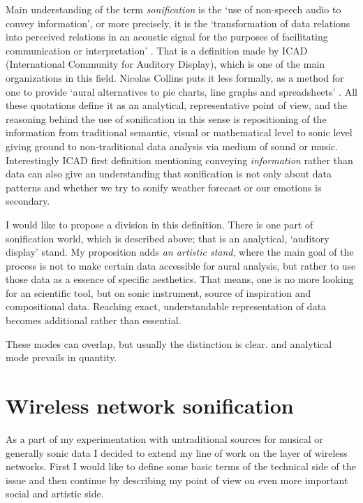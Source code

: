 \documentclass[11pt,a4paper,oneside]{report}
\begin{document}
Main understanding of the term \textit{sonification} is the `use of non-speech audio to convey information', or more precisely, it is the `transformation of data relations into perceived relations in an acoustic signal for the purposes of facilitating communication or interpretation' \cite{Fitch}. That is a definition made by ICAD (International Community for Auditory Display), which is one of the main organizations in this field. Nicolas Collins puts it less formally, as a method for one to provide `aural alternatives to pie charts, line graphs and spreadsheets' \cite{Collins2006}. All these quotations define it as an analytical, representative point of view, and the reasoning behind the use of sonification in this sense is repositioning of the information from traditional semantic, visual or mathematical level to sonic level giving ground to non-traditional data analysis via medium of sound or music. Interestingly ICAD first definition mentioning conveying \textit{information} rather than data can also give an understanding that sonification is not only about data patterns and whether we try to sonify weather forecast or our emotions is secondary.

I would like to propose a division in this definition. There is one part of sonification world, which is described above; that is an analytical, `auditory display' stand. My proposition adds \textit{an artistic stand}, where the main goal of the process is not to make certain data accessible for aural analysis, but rather to use those data as a essence of specific aesthetics. That means, one is no more looking for an scientific tool, but on sonic instrument, source of inspiration and compositional data. Reaching exact, understandable representation of data becomes additional rather than essential.

These modes can overlap, but usually the distinction is clear. and analytical mode prevails in quantity.

\section{Wireless network sonification}

As a part of my experimentation with untraditional sources for musical or generally sonic data I decided to extend my line of work on the layer of wireless networks. First I would like to define some basic terms of the technical side of the issue and then continue by describing my point of view on even more important social and artistic side. 
\end{document}
